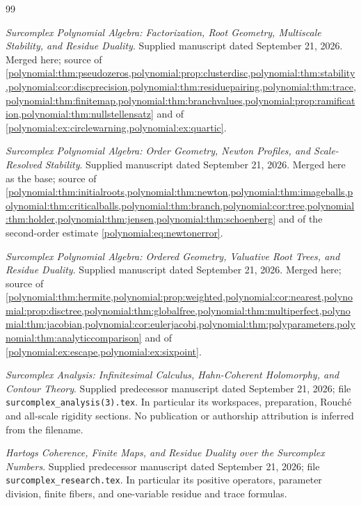 \documentclass[11pt,letterpaper]{article}
\numberwithin{equation}{section}
\theoremstyle{definition}
\theoremstyle{remark}\newtheorem{remark}[theorem]{Remark}
\begin{document}
\begin{thebibliography}{99}
\small

\emph{Surcomplex Polynomial Algebra: Factorization, Root Geometry, Multiscale
Stability, and Residue Duality}. Supplied manuscript dated September 21, 2026.
Merged here; source of
\cref{polynomial:thm:pseudozeros,polynomial:prop:clusterdisc,polynomial:thm:stability,polynomial:cor:discprecision,polynomial:thm:residuepairing,polynomial:thm:trace,polynomial:thm:finitemap,polynomial:thm:branchvalues,polynomial:prop:ramification,polynomial:thm:nullstellensatz}
and of \cref{polynomial:ex:circlewarning,polynomial:ex:quartic}.

\emph{Surcomplex Polynomial Algebra: Order Geometry, Newton Profiles, and
Scale-Resolved Stability}. Supplied manuscript dated September 21, 2026. Merged
here as the base; source of
\cref{polynomial:thm:initialroots,polynomial:thm:newton,polynomial:thm:imageballs,polynomial:thm:criticalballs,polynomial:thm:branch,polynomial:cor:tree,polynomial:thm:holder,polynomial:thm:jensen,polynomial:thm:schoenberg}
and of the second-order estimate
\eqref{polynomial:eq:newtonerror}.

\emph{Surcomplex Polynomial Algebra: Ordered Geometry, Valuative Root Trees,
and Residue Duality}. Supplied manuscript dated September 21, 2026. Merged
here; source of
\cref{polynomial:thm:hermite,polynomial:prop:weighted,polynomial:cor:nearest,polynomial:prop:disctree,polynomial:thm:globalfree,polynomial:thm:multiperfect,polynomial:thm:jacobian,polynomial:cor:eulerjacobi,polynomial:thm:polyparameters,polynomial:thm:analyticcomparison}
and of \cref{polynomial:ex:escape,polynomial:ex:sixpoint}.

\emph{Surcomplex Analysis: Infinitesimal Calculus, Hahn-Coherent Holomorphy,
and Contour Theory}. Supplied predecessor manuscript dated September 21, 2026;
file \texttt{surcomplex\_analysis(3).tex}. In particular its workspaces,
preparation, Rouch\'e and all-scale rigidity sections. No publication or
authorship attribution is inferred from the filename.

\emph{Hartogs Coherence, Finite Maps, and Residue Duality over the Surcomplex
Numbers}. Supplied predecessor manuscript dated September 21, 2026; file
\texttt{surcomplex\_research.tex}. In particular its positive operators,
parameter division, finite fibers, and one-variable residue and trace
formulas.


\end{thebibliography}
\end{document}

